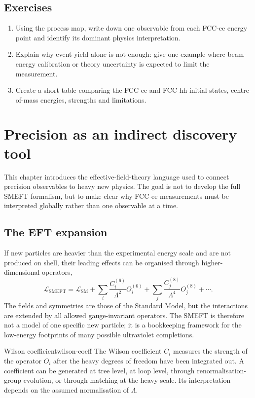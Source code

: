 \documentclass[11pt,a4paper]{article}
\newcommand{\Lag}{\mathcal{L}}
\newcommand{\SM}{\mathrm{SM}}
\newcommand{\SMEFT}{\mathrm{SMEFT}}
\numberwithin{equation}{section}
\begin{document}
\subsection{Exercises}
\begin{enumerate}[leftmargin=1.6em]
\item Using the process map, write down one observable from each FCC-ee energy point and identify its dominant physics interpretation.
\item Explain why event yield alone is not enough: give one example where beam-energy calibration or theory uncertainty is expected to limit the measurement.
\item Create a short table comparing the FCC-ee and FCC-hh initial states, centre-of-mass energies, strengths and limitations.
\end{enumerate}


\newpage
\section{Precision as an indirect discovery tool}
\begin{guidelinebox}
This chapter introduces the effective-field-theory language used to connect precision observables to heavy new physics. The goal is not to develop the full SMEFT formalism, but to make clear why FCC-ee measurements must be interpreted globally rather than one observable at a time.
\end{guidelinebox}

\subsection{The EFT expansion}
If new particles are heavier than the experimental energy scale and are not produced on shell, their leading effects can be organised through higher-dimensional operators,
\begin{equation}
  \Lag_{\SMEFT}=\Lag_{\SM}+\sum_i \frac{C_i^{(6)}}{\Lambda^2}O_i^{(6)}
  +\sum_j\frac{C_j^{(8)}}{\Lambda^4}O_j^{(8)}+\cdots .
  \label{eq:smeft-lagrangian-basic}
\end{equation}
The fields and symmetries are those of the Standard Model, but the interactions are extended by all allowed gauge-invariant operators. The SMEFT is therefore not a model of one specific new particle; it is a bookkeeping framework for the low-energy footprints of many possible ultraviolet completions.

\begin{definition}{Wilson coefficient}{wilson-coeff}
The Wilson coefficient \(C_i\) measures the strength of the operator \(O_i\) after the heavy degrees of freedom have been integrated out. A coefficient can be generated at tree level, at loop level, through renormalisation-group evolution, or through matching at the heavy scale. Its interpretation depends on the assumed normalisation of \(\Lambda\).
\end{definition}
\end{document}
